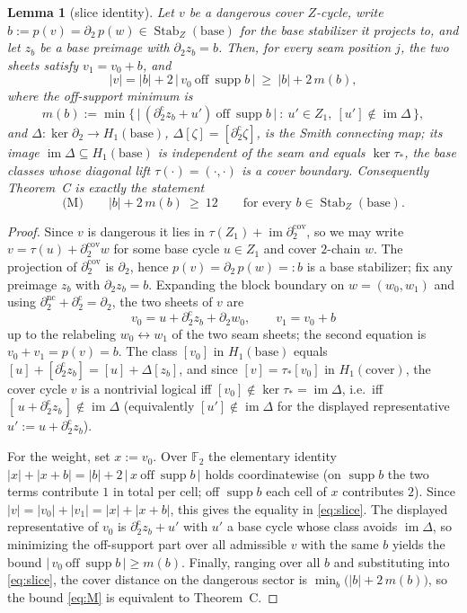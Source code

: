 \documentclass[11pt]{article}
\newcommand{\F}[1]{\mathbb{F}_{#1}}
\newcommand{\wt}[1]{\lvert #1\rvert}
\DeclareMathOperator{\img}{im}
\DeclareMathOperator{\supp}{supp}
\DeclareMathOperator{\Stab}{Stab}
\newcommand{\dcut}{\partial_2^{\mathrm{c}}}     %
\newcommand{\dncut}{\partial_2^{\mathrm{nc}}}   %
\newcommand{\cmap}{\Delta}                       %
\theoremstyle{plain}
\newtheorem{lemma}{Lemma}[section]
\theoremstyle{definition}
\theoremstyle{remark}
\begin{document}
\begin{lemma}[slice identity]\label{lem:slice}
Let $v$ be a dangerous cover $Z$-cycle, write $b:=p(v)=\partial_2\,p(w)\in\Stab_Z(\mathrm{base})$
for the base stabilizer it projects to, and let $z_b$ be a base preimage with
$\partial_2 z_b=b$. Then, for every seam position $j$, the two sheets satisfy
$v_1=v_0+b$, and
\begin{equation}\label{eq:slice}
  \wt{v}=\wt{b}+2\,\bigl|\,v_0\ \text{off}\ \supp b\,\bigr|\ \ge\ \wt{b}+2\,m(b),
\end{equation}
where the \emph{off-support minimum} is
\[
  m(b):=\min\bigl\{\,\bigl|\,(\dcut z_b+u')\ \text{off}\ \supp b\,\bigr|
  \ :\ u'\in Z_1,\ [u']\notin\img\cmap\,\bigr\},
\]
and $\cmap\colon\ker\partial_2\to H_1(\mathrm{base})$, $\cmap[\zeta]=[\dcut\zeta]$, is the
Smith connecting map; its image $\img\cmap\subseteq H_1(\mathrm{base})$ is independent of the
seam and equals $\ker\tau_\ast$, the base classes whose diagonal lift $\tau(\cdot)=(\cdot,\cdot)$
is a cover boundary. Consequently Theorem~C is exactly the statement
\begin{equation}\label{eq:M}
  \text{(M)}\qquad \wt{b}+2\,m(b)\ \ge\ 12\qquad\text{for every }b\in\Stab_Z(\mathrm{base}).
\end{equation}
\end{lemma}

\begin{proof}
Since $v$ is dangerous it lies in $\tau(Z_1)+\img\partial_2^{\mathrm{cov}}$, so we may
write $v=\tau(u)+\partial_2^{\mathrm{cov}}w$ for some base cycle $u\in Z_1$ and cover
$2$-chain $w$. The projection of $\partial_2^{\mathrm{cov}}$ is $\partial_2$, hence
$p(v)=\partial_2\,p(w)=:b$ is a base stabilizer; fix any preimage $z_b$ with
$\partial_2 z_b=b$. Expanding the block boundary on $w=(w_0,w_1)$ and using
$\dncut+\dcut=\partial_2$, the two sheets of $v$ are
\[
  v_0=u+\dcut z_b+\partial_2 w_0,\qquad v_1=v_0+b
\]
up to the relabeling $w_0\leftrightarrow w_1$ of the two seam sheets; the second equation
is $v_0+v_1=p(v)=b$. The class $[v_0]$ in $H_1(\mathrm{base})$ equals
$[u]+[\dcut z_b]=[u]+\cmap[z_b]$, and since $[v]=\tau_\ast[v_0]$ in $H_1(\mathrm{cover})$, the
cover cycle $v$ is a nontrivial logical iff $[v_0]\notin\ker\tau_\ast=\img\cmap$, i.e.\ iff
$[\,u+\dcut z_b\,]\notin\img\cmap$ (equivalently $[u']\notin\img\cmap$ for the displayed
representative $u':=u+\dcut z_b$).

For the weight, set $x:=v_0$. Over $\F2$ the elementary identity
$\wt{x}+\wt{x+b}=\wt{b}+2\,\bigl|\,x\ \text{off}\ \supp b\,\bigr|$ holds coordinatewise
(on $\supp b$ the two terms contribute $1$ in total per cell; off $\supp b$ each cell of
$x$ contributes $2$). Since $\wt{v}=\wt{v_0}+\wt{v_1}=\wt{x}+\wt{x+b}$, this gives the
equality in \eqref{eq:slice}. The displayed representative of $v_0$ is
$\dcut z_b+u'$ with $u'$ a base cycle whose class avoids $\img\cmap$, so minimizing the
off-support part over all admissible $v$ with the same $b$ yields the bound
$\bigl|\,v_0\ \text{off}\ \supp b\,\bigr|\ge m(b)$. Finally, ranging over all $b$ and
substituting into \eqref{eq:slice}, the cover distance on the dangerous sector is
$\min_b\bigl(\wt{b}+2\,m(b)\bigr)$, so the bound \eqref{eq:M} is equivalent to
Theorem~C.
\end{proof}
\end{document}
